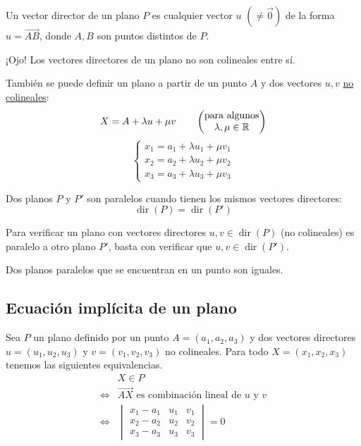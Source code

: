 \documentclass[11pt,a4paper]{article}
\DeclareMathOperator{\dir}{dir}
\begin{document}
\begin{definicion}
Un vector director de un plano $P$ es cualquier vector $u$ $(\neq\vec0)$ de la forma $u=\overrightarrow{AB}$, donde $A,B$ son puntos distintos de $P$.
\end{definicion}

¡Ojo! Los vectores directores de un plano no son colineales entre sí.

También se puede definir un plano a partir de un punto $A$ y dos vectores $u,v$ \underline{no colineales}:
\[
X=A+\lambda u+\mu v
\qquad
\begin{pmatrix}\text{para algunos}\\\lambda,\mu\in\mathbb{R}\end{pmatrix}
\]
\[
\begin{cases}
x_1=a_1+\lambda u_1+\mu v_1\\
x_2=a_2+\lambda u_2+\mu v_2\\
x_3=a_3+\lambda u_3+\mu v_3
\end{cases}
\]

\begin{definicion}
Dos planos $P$ y $P'$ son paralelos cuando tienen los mismos vectores directores:
\[
\dir(P)=\dir(P')
\]
\end{definicion}

Para verificar un plano con vectores directores $u,v\in\dir(P)$ (no colineales) es paralelo a otro plano $P'$, basta con verificar que $u,v\in\dir(P')$.

\begin{observacion}
Dos planos paralelos que se encuentran en un punto son iguales.
\end{observacion}

\subsection{Ecuación implícita de un plano}

\begin{proposicion}
Sea $P$ un plano definido por un punto $A=(a_1,a_2,a_3)$ y dos vectores directores $u=(u_1,u_2,u_3)$ y $v=(v_1,v_2,v_3)$ no colineales. Para todo $X=(x_1,x_2,x_3)$ tenemos las siguientes equivalencias.
\begin{align*}
&X\in P\\
\iff{}&\overrightarrow{AX}\text{ es combinación lineal de } u \text{ y } v\\
\iff{}&\begin{vmatrix}
x_1-a_1&u_1&v_1\\
x_2-a_2&u_2&v_2\\
x_3-a_3&u_3&v_3
\end{vmatrix}=0
\end{align*}
\end{proposicion}
\end{document}
